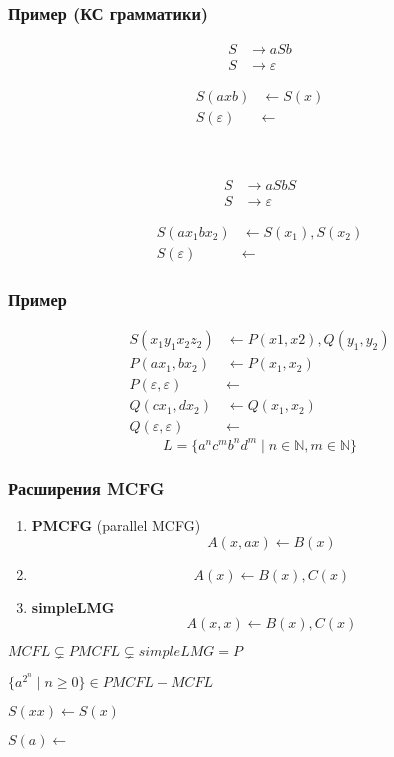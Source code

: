 \documentclass{beamer}
\begin{document}
\begin{frame}[fragile]
  \frametitle{Пример (КС грамматики)}
\begin{minipage}[t]{0.48\textwidth}
\begin{align*}
S &\to a S b \\
S &\to \varepsilon
\end{align*} 

\begin{align*}
S(axb) & \leftarrow S(x) \\
S(\varepsilon) & \leftarrow 
\end{align*} 
\end{minipage}
~\pause
\begin{minipage}[t]{0.48\textwidth}
\begin{align*}
S &\to a S b S\\
S &\to \varepsilon
\end{align*} 

\begin{align*}
S(ax_1bx_2) & \leftarrow S(x_1), S(x_2) \\
S(\varepsilon) & \leftarrow 
\end{align*} 
\end{minipage}

\end{frame}


\begin{frame}[fragile]
  
  \frametitle{Пример}

\begin{align*}
S(x_1 y_1 x_2 z_2) & \leftarrow P(x1,x2),Q(y_1,y_2) \\
P(ax_1, bx_2) & \leftarrow P(x_1,x_2) \\
P(\varepsilon,\varepsilon) &\leftarrow  \\
Q(cx_1, dx_2) & \leftarrow Q(x_1,x_2) \\
Q(\varepsilon,\varepsilon) &\leftarrow  
\end{align*} 
\pause
$$
L = \{a^nc^mb^nd^m \mid n \in \mathbb{N}, m \in \mathbb{N} \}
$$
\end{frame}

\begin{frame}[fragile]
  
  \frametitle{Расширения MCFG}
  \begin{enumerate}
    \item \textbf{PMCFG} (parallel MCFG) 
    $$
    A(x, ax) \leftarrow B(x)
    $$

    \item 
    $$
    A(x) \leftarrow B(x),C(x)
    $$
    \item \textbf{simpleLMG} 
    $$
    A(x, x) \leftarrow B(x),C(x)
    $$
  \end{enumerate}
  \pause
  $MCFL \varsubsetneq PMCFL \varsubsetneq simpleLMG = P$

  $\{a^{2^n} \mid n\geq 0\} \in PMCFL - MCFL $

  $S(xx) \leftarrow S(x)$  

  $S(a) \leftarrow $
\end{frame}
\end{document}
